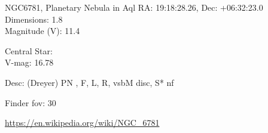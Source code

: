 \begin{block}{NGC6781, Planetary Nebula in Aql}
    RA: 19:18:28.26, Dec: +06:32:23.0 \\ 
    Dimensions: 1.8 \\ 
    Magnitude (V): 11.4

    Central Star: \\ 
      \hspace{1em}V-mag: 16.78 

    Desc: (Dreyer) PN , F, L, R, vsbM disc, S* nf 

    Finder fov: 30 

    \url{https://en.wikipedia.org/wiki/NGC_6781} 
\end{block}